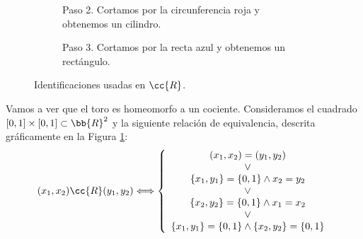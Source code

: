 \begin{ejemplo}
\begin{enumerate}
\begin{figure}[H]
\begin{subfigure}[c]{0.25\linewidth}
                \caption{\centering Paso 2. Cortamos por la circunferencia roja y obtenemos un cilindro.}
            \end{subfigure}\hfill
            \begin{subfigure}[c]{0.25\linewidth}
                \centering
                \caption{\centering Paso 3. Cortamos por la recta azul y obtenemos un rectángulo.}
            \end{subfigure}
            \caption{\centering Identificaciones usadas en $\cc{R}$.}
            \label{fig:Toro_R}
        \end{figure}

        Vamos a ver que el toro es homeomorfo a un cociente. Consideramos el cuadrado $[0,1]\times [0,1]\subset \bb{R}^2$ y la siguiente relación de equivalencia, descrita gráficamente en la Figura \ref{fig:Toro_R}:
        \begin{equation*}
            (x_1,x_2)\cc{R}(y_1,y_2) \Longleftrightarrow \left\{\begin{array}{c}
                (x_1,x_2)=(y_1,y_2) \\ \lor \\
                \{x_1,y_1\} =\{0,1\} \land x_2=y_2\\ \lor \\
                \{x_2,y_2\} =\{0,1\} \land x_1=x_2
                \\ \lor \\
                \{x_1,y_1\} =\{0,1\} \land \{x_2,y_2\} =\{0,1\}
            \end{array}\right.
        \end{equation*}


\end{enumerate}
\end{ejemplo}
